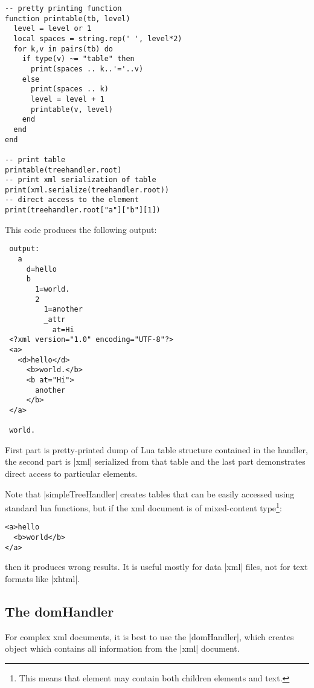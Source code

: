 \documentclass{ltxdoc}
\begin{document}
\begin{verbatim}
-- pretty printing function
function printable(tb, level)
  level = level or 1
  local spaces = string.rep(' ', level*2)
  for k,v in pairs(tb) do
    if type(v) ~= "table" then
      print(spaces .. k..'='..v)
    else
      print(spaces .. k)
      level = level + 1
      printable(v, level)
    end
  end
end

-- print table
printable(treehandler.root)
-- print xml serialization of table
print(xml.serialize(treehandler.root))
-- direct access to the element
print(treehandler.root["a"]["b"][1])
\end{verbatim}

This code produces the following output:

\begin{verbatim}
 output:
   a
     d=hello
     b
       1=world.
       2
         1=another
         _attr
           at=Hi
 <?xml version="1.0" encoding="UTF-8"?>
 <a>
   <d>hello</d>
     <b>world.</b>
     <b at="Hi">
       another
     </b>
 </a>
 
 world.
\end{verbatim}

First part is pretty-printed dump of Lua table structure contained in the handler, the second
part is |xml| serialized from that table and the last part demonstrates direct access to particular
elements.

Note that |simpleTreeHandler| creates tables that can be easily accessed using
standard lua functions, but if the xml document is of mixed-content type\footnote{%
This means that element may contain both children elements and text.}:

\begin{verbatim}
<a>hello
  <b>world</b>
</a>	  
\end{verbatim}

\noindent then it produces wrong results. It is useful mostly for data |xml| files, not for
text formats like |xhtml|.

\subsection{The domHandler}

For complex xml documents, it is best to use the |domHandler|, which creates object which contains all information
from the |xml| document. 
\end{document}
